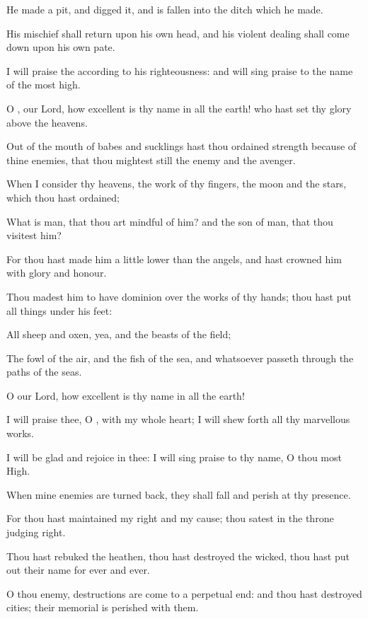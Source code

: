 \Verse He made a pit, and digged it, and is fallen into the ditch which he made.

\Verse His mischief shall return upon his own head, and his violent dealing shall come down upon his own pate.

\Verse I will praise the \LORD according to his righteousness: and will sing praise to the name of the \LORD most high.




\Chapter
\Verse O \LORD, our Lord, how excellent is thy name in all the earth! who hast set thy glory above the heavens.

\Verse Out of the mouth of babes and sucklings hast thou ordained strength because of thine enemies, that thou mightest still the enemy and the avenger.

\Verse When I consider thy heavens, the work of thy fingers, the moon and the stars, which thou hast ordained;

\Verse What is man, that thou art mindful of him? and the son of man, that thou visitest him?

\Verse For thou hast made him a little lower than the angels, and hast crowned him with glory and honour.

\Verse Thou madest him to have dominion over the works of thy hands; thou hast put all things under his feet:

\Verse All sheep and oxen, yea, and the beasts of the field;

\Verse The fowl of the air, and the fish of the sea, and whatsoever passeth through the paths of the seas.

\Verse O \LORD our Lord, how excellent is thy name in all the earth!



\Chapter
\Verse I will praise thee, O \LORD, with my whole heart; I will shew forth all thy marvellous works.

\Verse I will be glad and rejoice in thee: I will sing praise to thy name, O thou most High.

\Verse When mine enemies are turned back, they shall fall and perish at thy presence.

\Verse For thou hast maintained my right and my cause; thou satest in the throne judging right.

\Verse Thou hast rebuked the heathen, thou hast destroyed the wicked, thou hast put out their name for ever and ever.

\Verse O thou enemy, destructions are come to a perpetual end: and thou hast destroyed cities; their memorial is perished with them.

